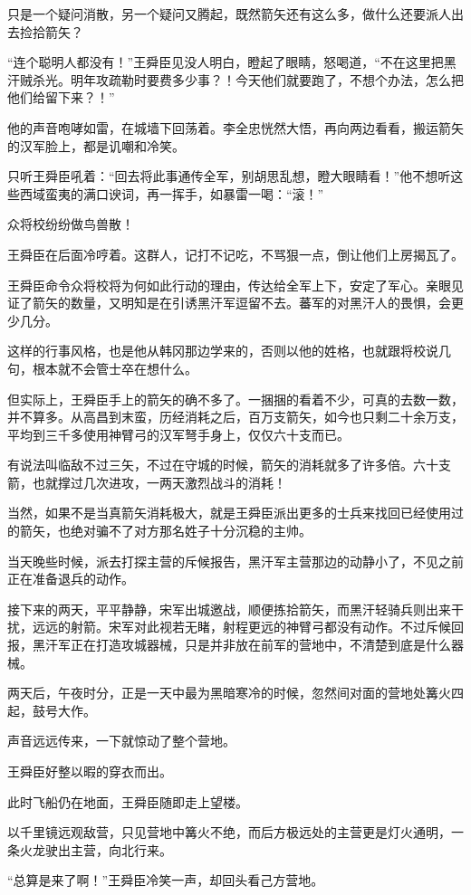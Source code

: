 只是一个疑问消散，另一个疑问又腾起，既然箭矢还有这么多，做什么还要派人出去捡拾箭矢？

“连个聪明人都没有！”王舜臣见没人明白，瞪起了眼睛，怒喝道，“不在这里把黑汗贼杀光。明年攻疏勒时要费多少事？！今天他们就要跑了，不想个办法，怎么把他们给留下来？！”

他的声音咆哮如雷，在城墙下回荡着。李全忠恍然大悟，再向两边看看，搬运箭矢的汉军脸上，都是讥嘲和冷笑。

只听王舜臣吼着：“回去将此事通传全军，别胡思乱想，瞪大眼睛看！”他不想听这些西域蛮夷的满口谀词，再一挥手，如暴雷一喝：“滚！”

众将校纷纷做鸟兽散！

王舜臣在后面冷哼着。这群人，记打不记吃，不骂狠一点，倒让他们上房揭瓦了。

王舜臣命令众将校将为何如此行动的理由，传达给全军上下，安定了军心。亲眼见证了箭矢的数量，又明知是在引诱黑汗军逗留不去。蕃军的对黑汗人的畏惧，会更少几分。

这样的行事风格，也是他从韩冈那边学来的，否则以他的姓格，也就跟将校说几句，根本就不会管士卒在想什么。

但实际上，王舜臣手上的箭矢的确不多了。一捆捆的看着不少，可真的去数一数，并不算多。从高昌到末蛮，历经消耗之后，百万支箭矢，如今也只剩二十余万支，平均到三千多使用神臂弓的汉军弩手身上，仅仅六十支而已。

有说法叫临敌不过三矢，不过在守城的时候，箭矢的消耗就多了许多倍。六十支箭，也就撑过几次进攻，一两天激烈战斗的消耗！

当然，如果不是当真箭矢消耗极大，就是王舜臣派出更多的士兵来找回已经使用过的箭矢，也绝对骗不了对方那名姓子十分沉稳的主帅。

当天晚些时候，派去打探主营的斥候报告，黑汗军主营那边的动静小了，不见之前正在准备退兵的动作。

接下来的两天，平平静静，宋军出城邀战，顺便拣拾箭矢，而黑汗轻骑兵则出来干扰，远远的射箭。宋军对此视若无睹，射程更远的神臂弓都没有动作。不过斥候回报，黑汗军正在打造攻城器械，只是并非放在前军的营地中，不清楚到底是什么器械。

两天后，午夜时分，正是一天中最为黑暗寒冷的时候，忽然间对面的营地处篝火四起，鼓号大作。

声音远远传来，一下就惊动了整个营地。

王舜臣好整以暇的穿衣而出。

此时飞船仍在地面，王舜臣随即走上望楼。

以千里镜远观敌营，只见营地中篝火不绝，而后方极远处的主营更是灯火通明，一条火龙驶出主营，向北行来。

“总算是来了啊！”王舜臣冷笑一声，却回头看己方营地。

